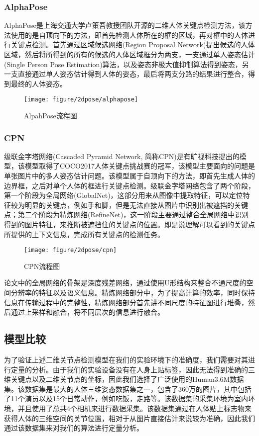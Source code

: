 \subsubsection{AlphaPose}
AlphaPose是上海交通大学卢策吾教授团队开源的二维人体关键点检测方法，该方法使用的是自顶向下的方法，即首先检测人体所在的框的区域，再对框中的人体进行关键点检测。首先通过区域候选网络(Region Proposal Network)提出候选的人体区域，然后将所得到的所有的候选的人体区域框分为两支，一支通过单人姿态估计(Single Person Pose Estimation)算法，以及姿态非极大值抑制算法得到姿态，另一支直接通过单人姿态估计得到人体的姿态，最后将两支分路的结果进行整合，得到最终的人体姿态。
\begin{figure}[H]
    \centering
    \texttt{[image: figure/2dpose/alphapose]}
    \caption{\label{fig:2d-ap} AlpahPose流程图}
\end{figure}

\subsubsection{CPN}
级联金字塔网络(Cascaded Pyramid Network, 简称CPN)是有旷视科技提出的模型，该模型取得了COCO2017人体关键点挑战赛的冠军，该模型主要面向的问题是单张图片中的多人姿态估计问题。该模型属于自顶向下的方法，即首先生成人体的边界框，之后对单个人体的框进行关键点检测。级联金字塔网络包含了两个阶段，第一个阶段为全局网络(GlobalNet)，这部分用来从图像中提取特征，可以定位特征较为明显的关键点，例如手和脚，但是无法直接从图片中识别出被遮挡的关键点；第二个阶段为精炼网络(RefineNet)，这一阶段主要通过整合全局网络中识别得到的图片特征，来推断被遮挡住的关键点的位置。即是说理解可以看到的关键点所提供的上下文信息，完成所有关键点的检测任务。
\begin{figure}[H]
    \centering
    \texttt{[image: figure/2dpose/cpn]}
    \caption{\label{fig:2d-cpn} CPN流程图}
\end{figure}
论文中的全局网络的骨架是深度残差网络\cite{resnet}，通过使用U形结构来整合不通尺度的空间分辨率的特征以及语义信息。精炼网络部分中，为了提高计算的效率，同时保持信息在传输过程中的完整性，精炼网络部分首先讲不同尺度的特征图进行堆叠，然后通过上采样和融合，将不同层次的信息进行融合。

\subsection{模型比较}
为了验证上述二维关节点检测模型在我们的实验环境下的准确度，我们需要对其进行定量的分析。由于我们的实验设备没有在人身上贴标签，因此无法得到准确的三维关键点以及二维关节点的坐标，因此我们选择了广泛使用的Human3.6M数据集。该数据集是最大的人体三维姿态数据集之一，包含了360万的图片，其中包括了11个演员以及15个日常动作，例如吃饭，走路等。该数据集的采集环境为室内环境，并且使用了总共4个相机来进行数据采集。该数据集通过在人体贴上标志物来获得人体的三维空间的关节位置，相对于从图片直接估计来说较为准确，因此我们通过该数据集来对我们的算法进行定量分析。

